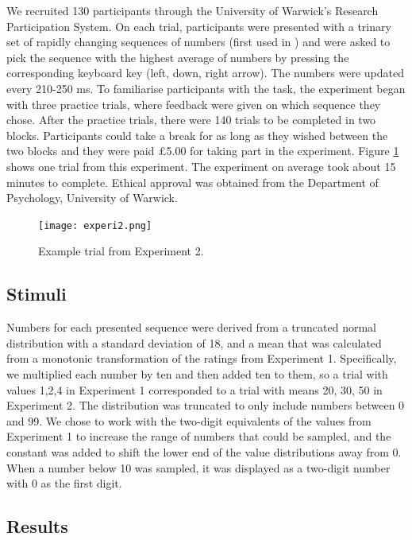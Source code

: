 \documentclass[11pt,a4paper]{article}
\begin{document}
We recruited 130 participants through the University of Warwick's Research Participation System. On each trial, participants were presented with a trinary set of rapidly changing sequences of numbers (first used in \citeauthor{Tsetsos2012a}) and were asked to pick the sequence with the highest average of numbers by pressing the corresponding keyboard key (left, down, right arrow). The numbers were updated every 210-250 ms. To familiarise participants with the task, the experiment began with three practice trials, where feedback were given on which sequence they chose. After the practice trials, there were 140 trials to be completed in two blocks. Participants could take a break for as long as they wished between the two blocks and they were paid £5.00 for taking part in the experiment. Figure \ref{fig:experi2_numbers} shows one trial from this experiment. The experiment on average took about 15 minutes to complete. Ethical approval was obtained from the Department of Psychology, University of Warwick.

\begin{figure}
\captionsetup{justification=centering}
\centering
\caption{Example trial from Experiment 2.}
\texttt{[image: experi2.png]}
\label{fig:experi2_numbers}
\end{figure}

\subsection{Stimuli}

Numbers for each presented sequence were derived from a truncated normal distribution with a standard deviation of 18, and a mean that was calculated from a monotonic transformation of the ratings from Experiment 1. Specifically, we multiplied each number by ten and then added ten to them, so a trial with values 1,2,4 in Experiment 1 corresponded to a trial with means 20, 30, 50 in Experiment 2. The distribution was truncated to only include numbers between 0 and 99. We chose to work with the two-digit equivalents of the values from Experiment 1 to increase the range of numbers that could be sampled, and the constant was added to shift the lower end of the value distributions away from 0. When a number below 10 was sampled, it was displayed as a two-digit number with 0 as the first digit. 


\subsection{Results}
\end{document}
